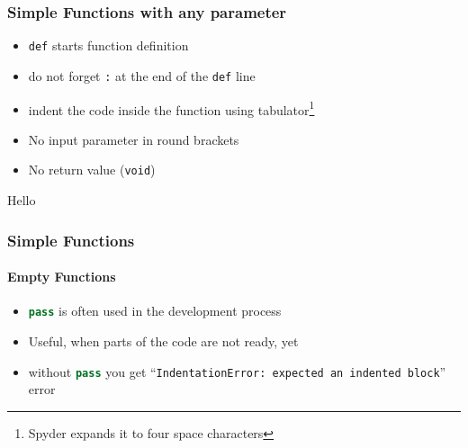 \documentclass[english]{beamer}
\newcommand{\ta}[1]{\textattachfile[color=1 0 0]{#1}{Code}}
\begin{document}
%
%
%
%
%


\begin{frame}[containsverbatim]
\frametitle{Simple Functions with any parameter}

\begin{itemize}
	\item \texttt{def} starts function definition
	\item do not forget \texttt{:} at the end of the \texttt{def} line
	\item indent the code inside the function using tabulator\footnote{Spyder expands it to four space characters}
	\item No input parameter in round brackets
	\item No return value (\texttt{void})
\end{itemize}



\begin{ausgabe}
Hello
\end{ausgabe}

\end{frame}

\begin{frame}[containsverbatim]
\frametitle{Simple Functions}
\framesubtitle{Empty Functions}

\begin{itemize}
\item \lstinline[language={Python}]{pass} is often used in the development process
\item Useful, when parts of the code are not ready, yet
\item without \lstinline[language={Python}]{pass} you get  \enquote{\texttt{IndentationError: expected an indented block}} error
\end{itemize}



\end{frame}
\end{document}
